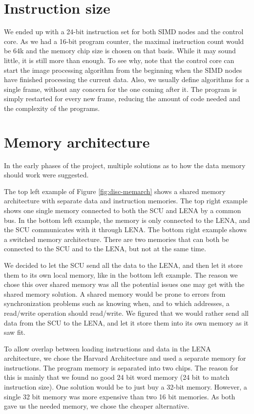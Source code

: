 \section{Instruction size}
We ended up with a 24-bit instruction set for both \ac{SIMD} nodes and the
control core. As we had a 16-bit program counter, the maximal
instruction count would be 64k and the memory chip size is chosen on that
basis. While it may sound little, it is still more than enough. To see why, note
that the control core can start the image processing algorithm from the
beginning when the \ac{SIMD} nodes have finished processing the current data.
Also, we usually define algorithms for a single frame, without any concern for
the one coming after it. The program is simply restarted for every new frame,
reducing the amount of code needed and the complexity of the programs.

\section {Memory architecture}
 

In the early phases of the project, multiple solutions as to how the data memory
should work were suggested. 

The top left example of Figure \ref{fig:disc-memarch} shows a shared memory architecture with separate data and
instruction memories. The top right example shows one single memory connected to
both the SCU and LENA by a common bus. In the bottom left example, the memory is
only connected to the LENA, and the SCU communicates with it through LENA. 
The bottom right example shows a switched memory architecture. There are two memories
that can both be connected to the SCU and to the LENA, but not at the same time.

We decided to let the \ac{SCU} send all the data to
the \ac{LENA}, and then let it store them to its own local memory, like in the bottom left example. The reason we
chose this over shared memory was all the potential issues one may get with the
shared memory solution. A shared memory would be prone to errors from
synchronization problems such as knowing when, and to which addresses, a
read/write operation should read/write. We figured that we would rather send all
data from the \ac{SCU} to the \ac{LENA}, and let it store them into its own
memory as it saw fit.

To allow overlap between loading instructions and data in the LENA architecture,
we chose the Harvard Architecture and used a separate memory for
instructions. The program memory is separated into two chips. The reason for
this is mainly that we found no good 24 bit word memory (24 bit to match instruction
size). One solution would be to just buy a 32-bit memory. However, a single 32 bit
memory was more expensive than two 16 bit memories. As both gave us the needed
memory, we chose the cheaper alternative.

